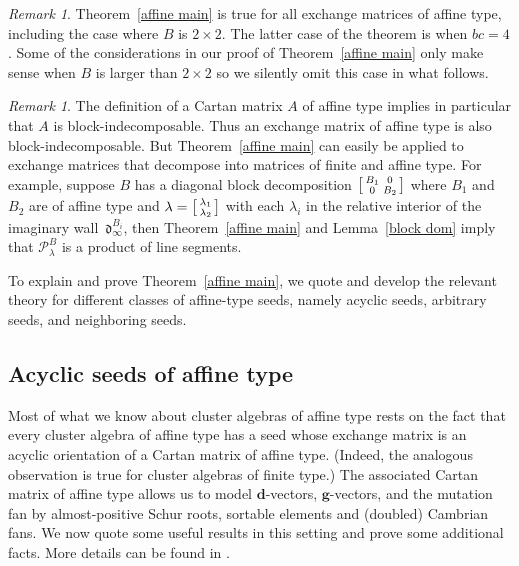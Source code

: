 \documentclass{amsart}
\theoremstyle{definition}
\theoremstyle{remark}
\newtheorem{remark}[proposition]{Remark}
\numberwithin{equation}{section}
\newcommand{\0}{{\mathbf{0}}}
\newcommand{\g}{\mathbf{g}}
\renewcommand{\P}{\mathcal{P}}
\renewcommand{\d}{{\mathfrak d}}
\newcommand{\dd}{{\mathbf d}}
\begin{document}
\begin{remark}\label{2x2}
Theorem~\ref{affine main} is true for all exchange matrices of affine type, including the case where $B$ is $2\times2$.
The latter case of the theorem is \cite[Theorem 1.2]{RSDom} when $bc=4$.  
Some of the considerations in our proof of Theorem~\ref{affine main} only make sense when $B$ is larger than $2\times2$ so we silently omit this case in what follows.
\end{remark}

\begin{remark}\label{indecomposable}
The definition of a Cartan matrix $A$ of affine type implies in particular that $A$ is block-indecomposable.
Thus an exchange matrix of affine type is also block-indecomposable.
But Theorem~\ref{affine main} can easily be applied to exchange matrices that decompose into matrices of finite and affine type.
For example, suppose $B$ has a diagonal block decomposition $\begin{bsmallmatrix}B_1&0\\0&B_2\end{bsmallmatrix}$ where $B_1$ and $B_2$ are of affine type and $\lambda=\begin{bsmallmatrix}\lambda_1\\\lambda_2\end{bsmallmatrix}$ with each $\lambda_i$ in the relative interior of the imaginary wall~$\d^{B_i}_\infty$, then Theorem~\ref{affine main} and Lemma~\ref{block dom} imply that $\P_\lambda^B$ is a product of line segments.

\end{remark}

To explain and prove Theorem~\ref{affine main}, we quote and develop the relevant theory for different classes of affine-type seeds, namely acyclic seeds, arbitrary seeds, and neighboring seeds.

\subsection{Acyclic seeds of affine type}\label{acyc sec}
Most of what we know about cluster algebras of affine type rests on the fact that every cluster algebra of affine type has a seed whose exchange matrix is an acyclic orientation of a Cartan matrix of affine type.
(Indeed, the analogous observation is true for cluster algebras of finite type.)
The associated Cartan matrix of affine type allows us to model $\dd$-vectors, $\g$-vectors, and the mutation fan by almost-positive Schur roots, sortable elements and (doubled) Cambrian fans.
We now quote some useful results in this setting and prove some additional facts.
More details can be found in \cite{affdenom,framework,afframe,affscat}.
\end{document}
